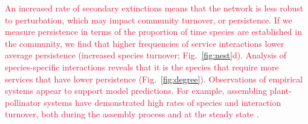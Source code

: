 \documentclass[twocolumn,preprintnumbers,amsmath,amssymb,superscriptaddress,linenumbers]{revtex4-1}
\newcommand{\rev}[1]{\textcolor{crimson}{#1}}
\begin{document}

\rev{An increased rate of secondary extinctions means that the network is less robust to perturbation, which may impact community turnover, or persistence.
If we measure persistence in terms of the proportion of time species are established in the community, we find that higher frequencies of service interactions lower average persistence (increased species turnover; Fig.\ \ref{fig:nest}d).
Analysis of species-specific interactions reveals that it is the species that require more services that have lower persistence (Fig.\ \ref{fig:degree}).
Observations of empirical systems appear to support model predictions.
For example, assembling plant-pollinator systems have demonstrated high rates of species and interaction turnover, both during the assembly process and at the steady state \cite{DiazCastelazo2013}.} %
\end{document}
